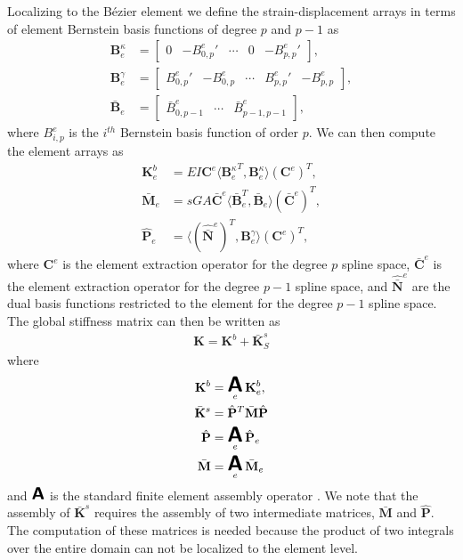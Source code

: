 Localizing to the B\'{e}zier element we define the strain-displacement arrays in terms of element Bernstein basis functions of degree $p$ and $p-1$ as
\begin{align}
    \mathbf{B}_e^\kappa
     & = \begin{bmatrix} 0 & -{B^e_{0,p}}' & \cdots & 0 & -{B^e_{p,p}}' \end{bmatrix}, \\
    \mathbf{B}_e^\gamma
     & = \begin{bmatrix} {B^e_{0,p}}' & -B^e_{0,p} & \cdots & {B^e_{p,p}}' & -B^e_{p,p} \end{bmatrix}, \\
    \bar{\mathbf{B}}_e
     & = \begin{bmatrix} \bar{B}^e_{0,p-1} & \cdots & \bar{B}^e_{p-1,p-1} \end{bmatrix},
\end{align}
{where $B^e_{i,p}$ is the $i^{th}$ Bernstein basis function of order $p$}. We can then compute the element arrays as
\begin{align}
    \mathbf{K}_e^b       & = EI\mathbf{C}^e\langle{{\mathbf{B}_e^\kappa}^T,\mathbf{B}_e^\kappa}\rangle(\mathbf{C}^e)^T, \label{eq:symmetric_timoshenko} \\
    \bar{\mathbf{M}}_e   & = s{GA}\bar{\mathbf{C}}^e\langle{\bar{\mathbf{B}}_e^T,\bar{\mathbf{B}}_e}\rangle(\bar{\mathbf{C}}^e)^T,                      \\
    {\hat{\mathbf{P}}_e} & = \langle{(\hat{\bar{\mathbf{N}}}^e)^T,\mathbf{B}^\gamma_e}\rangle(\mathbf{C}^e)^T \label{eq:P-hat-elem},
\end{align}
where $\mathbf{C}^e$ is the element extraction operator for the degree $p$ spline space, $\bar{\mathbf{C}}^e$ is the element extraction operator for the degree $p-1$ spline space, and $\hat{\bar{\mathbf{N}}}^e$ are the dual basis functions restricted to the element for the degree $p-1$ spline space. The global stiffness matrix can then be written as
\begin{align}
    \mathbf{K} = \mathbf{K}^b + \bar{\mathbf{K}}^s_S \label{eqn:symmetric_b_bar_timoshenko_stiffness}
\end{align}
where
\begin{align}
    \mathbf{K}^b       & =\A_e\mathbf{K}_e^b,\label{eqn:bending_stiffness}                                  \\
    \bar{\mathbf{K}}^s & ={\hat{\mathbf{P}}}^T\bar{\mathbf{M}}{\hat{\mathbf{P}}}\label{eqn:shear_stiffness} \\
    {\hat{\mathbf{P}}} & =\A_e{\hat{\mathbf{P}}_e} \label{eq:P-hat-global}                                  \\
    \bar{\mathbf{M}}   & =\A_e\bar{\mathbf{M}}_e
\end{align}
and $\A$ is the standard finite element assembly operator \cite{Hug00}. We note that the assembly of $\bar{\mathbf{K}}^s$ requires the assembly of two intermediate matrices, $\bar{\mathbf{M}}$ and ${\hat{\mathbf{P}}}$. The computation of these matrices is needed because the product of two integrals over the entire domain can not be localized to the element level.

